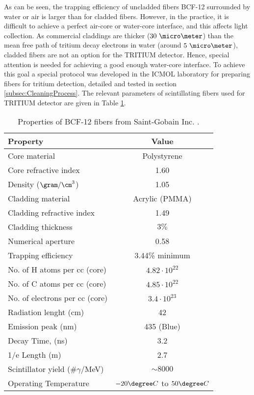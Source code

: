 As can be seen, the trapping efficiency of uncladded fibers BCF-12 surrounded by water or air is larger than for cladded fibers. However, in the practice, it is difficult to achieve a perfect air-core or water-core interface, and this affects light collection. As commercial claddings are thicker ($30~\micro \meter$) than the mean free path of tritium decay electrons in water (around $5~\micro\meter$), cladded fibers are not an option for the TRITIUM detector. Hence, special attention is needed for achieving a good enough water-core interface. To achieve this goal a special protocol was developed in the ICMOL laboratory for preparing fibers for tritium detection, detailed and tested in section \ref{subsec:CleaningProcess}. The relevant parameters of scintillating fibers used for TRITIUM detector are given in Table \ref{tab:ParametersFibersBCF12}.

\begin{table}[htbp]
\centering{}%
\begin{tabular}{lc}
\toprule 
Property & Value \tabularnewline
\midrule
\midrule 
Core material & Polystyrene \tabularnewline
Core refractive index & 1.60 \tabularnewline
Density ($\gram/\cm^3$) & 1.05 \tabularnewline
Cladding material & Acrylic (PMMA) \tabularnewline
Cladding refractive index & 1.49 \tabularnewline
Cladding thickness & $3\%$ \tabularnewline
Numerical aperture & 0.58 \tabularnewline
Trapping efficiency & 3.44\% minimum \tabularnewline
No. of H atoms per cc (core) & $4.82 \cdot{} 10^{22}$ \tabularnewline
No. of C atoms per cc (core) & $4.85 \cdot{} 10^{22}$ \tabularnewline
No. of electrons per cc (core) & $3.4 \cdot{} 10^{23}$ \tabularnewline
Radiation lenght (cm) & 42 \tabularnewline
Emission peak (nm) & 435 (Blue) \tabularnewline
Decay Time, (ns) & 3.2 \tabularnewline
1/e Length (m) & 2.7 \tabularnewline
Scintillator yield (\#$\gamma$/MeV) & $\sim 8000$ \tabularnewline
Operating Temperature & $-20\degree C$ to $50\degree C$ \tabularnewline
\bottomrule
\end{tabular}
\caption{Properties of BCF-12 fibers from Saint-Gobain Inc. \cite{DataSheetBCF12Fiber}.}
\label{tab:ParametersFibersBCF12}
\end{table}